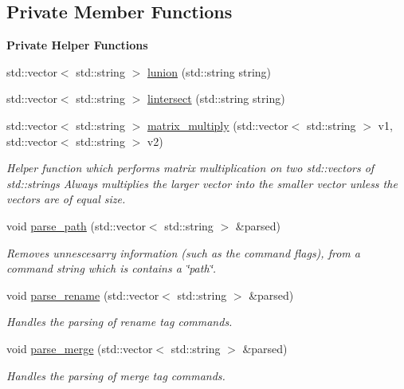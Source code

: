 \subsection*{Private Member Functions}
\begin{Indent}\textbf{ Private Helper Functions}\par
\begin{DoxyCompactItemize}
\item 
std\+::vector$<$ std\+::string $>$ \mbox{\hyperlink{class_parser_ac786ab202a25c76a069e124d1bdaa780}{lunion}} (std\+::string string)
\item 
std\+::vector$<$ std\+::string $>$ \mbox{\hyperlink{class_parser_af09e013dcba70865bdff465a7dafba6a}{lintersect}} (std\+::string string)
\item 
std\+::vector$<$ std\+::string $>$ \mbox{\hyperlink{class_parser_ac5276b177af3258fdd2437134652f9df}{matrix\+\_\+multiply}} (std\+::vector$<$ std\+::string $>$ v1, std\+::vector$<$ std\+::string $>$ v2)
\begin{DoxyCompactList}\small\item\em Helper function which performs matrix multiplication on two std\+::vector\textquotesingle{}s of std\+::string\textquotesingle{}s Always multiplies the larger vector into the smaller vector unless the vectors are of equal size. \end{DoxyCompactList}\item 
void \mbox{\hyperlink{class_parser_a8e7cd45cdf0fe9f3420f26a54a946f56}{parse\+\_\+path}} (std\+::vector$<$ std\+::string $>$ \&parsed)
\begin{DoxyCompactList}\small\item\em Removes unnescesarry information (such as the command flags), from a command string which is contains a \char`\"{}path\char`\"{}. \end{DoxyCompactList}\item 
void \mbox{\hyperlink{class_parser_a6e7db54feacd1bff189de70135cd3216}{parse\+\_\+rename}} (std\+::vector$<$ std\+::string $>$ \&parsed)
\begin{DoxyCompactList}\small\item\em Handles the parsing of \textquotesingle{}rename tag\textquotesingle{} commands. \end{DoxyCompactList}\item 
void \mbox{\hyperlink{class_parser_a4dff2c17612843df95b4ec6d4e4af847}{parse\+\_\+merge}} (std\+::vector$<$ std\+::string $>$ \&parsed)
\begin{DoxyCompactList}\small\item\em Handles the parsing of \textquotesingle{}merge tag\textquotesingle{} commands. \end{DoxyCompactList}\item 

\end{DoxyCompactItemize}
\end{Indent}
